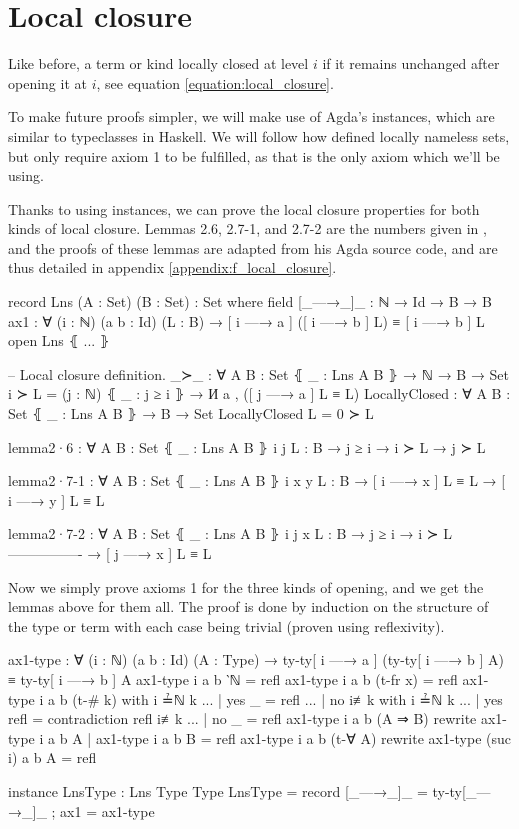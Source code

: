 \documentclass[logo,bsc,singlespacing,parskip,online]{infthesis}
\begin{document}
\section{Local closure}
\label{chapter4:local_closure}
Like before, a term or kind locally closed at level $i$ if it remains unchanged after opening it at
$i$, see equation \ref{equation:local_closure}.

To make future proofs simpler, we will make use of Agda's instances, which are similar to
typeclasses in Haskell. We will follow how \citet{pitts_locally_2023} defined locally nameless sets,
but only require axiom 1 to be fulfilled, as that is the only axiom which we'll be using.

Thanks to using instances, we can prove the local closure properties for both kinds of local
closure. Lemmas 2.6, 2.7-1, and 2.7-2 are the numbers given in \citet{pitts_locally_2023}, and the
proofs of these lemmas are adapted from his Agda source code, and are thus detailed in appendix \ref{appendix:f_local_closure}.
\begin{code}
  record Lns (A : Set) (B : Set) : Set where
    field
      [_—→_]_ : ℕ → Id → B → B
      ax1 : ∀ (i : ℕ) (a b : Id) (L : B)
        → [ i —→ a ] ([ i —→ b ] L) ≡ [ i —→ b ] L
  open Lns ⦃ ... ⦄

  -- Local closure definition.
  _≻_ : ∀ {A B : Set} ⦃ _ : Lns A B ⦄ → ℕ → B → Set
  i ≻ L = (j : ℕ) ⦃ _ : j ≥ i ⦄ → И a , ([ j —→ a ] L ≡ L)
  LocallyClosed : ∀ {A B : Set} ⦃ _ : Lns A B ⦄ → B → Set
  LocallyClosed L = 0 ≻ L

  lemma2·6 : ∀ {A B : Set} ⦃ _ : Lns A B ⦄ {i j} {L : B}
    → j ≥ i → i ≻ L → j ≻ L

  lemma2·7-1 : ∀ {A B : Set} ⦃ _ : Lns A B ⦄ {i x y} {L : B}
    → [ i —→ x ] L ≡ L → [ i —→ y ] L ≡ L

  lemma2·7-2 : ∀ {A B : Set} ⦃ _ : Lns A B ⦄ {i j x} {L : B}
    → j ≥ i    → i ≻ L
      ----------------
    → [ j —→ x ] L ≡ L
\end{code}

Now we simply prove axioms 1 for the three kinds of opening, and we get the lemmas above for them
all. The proof is done by induction on the structure of the type or term with each case being
trivial (proven using reflexivity).
\begin{code}
  ax1-type : ∀ (i : ℕ) (a b : Id) (A : Type)
    → ty-ty[ i —→ a ] (ty-ty[ i —→ b ] A) ≡ ty-ty[ i —→ b ] A
  ax1-type i a b ‵ℕ = refl
  ax1-type i a b (t-fr x) = refl
  ax1-type i a b (t-# k) with i ≟ℕ k
  ... | yes _   = refl
  ... | no  i≢k with i ≟ℕ k
  ...   | yes refl = contradiction refl i≢k
  ...   | no  _    = refl
  ax1-type i a b (A ⇒ B)
    rewrite ax1-type i a b A | ax1-type i a b B = refl
  ax1-type i a b (t-∀ A) rewrite ax1-type (suc i) a b A = refl

  instance
    LnsType : Lns Type Type
    LnsType = record
      { [_—→_]_ = ty-ty[_—→_]_
      ; ax1 = ax1-type }
\end{code}
\end{document}
